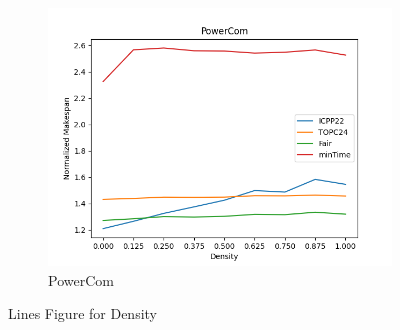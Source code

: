 \documentclass{article}
\begin{document}
\begin{figure}[htbp]
\begin{subfigure}[b]{0.32\textwidth}\includegraphics[width=\textwidth]{Results/Density/Density_PowerCom}\caption{PowerCom}\label{fig:lines_figures_Density_PowerCom}\end{subfigure}
\hfill
\caption{Lines Figure for Density}
\label{fig:lines_figures_Density}
\end{figure}
\end{document}
